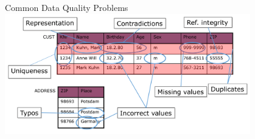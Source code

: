 \documentclass[aspectratio=169]{../latex_main/tntbeamer}  %
\begin{document}
\begin{frame}[c]{Common Data Quality Problems}
    \centering
    \includegraphics[width=0.8\textwidth]{bild13_dataquality_problems.png}

\end{frame}
\end{document}
